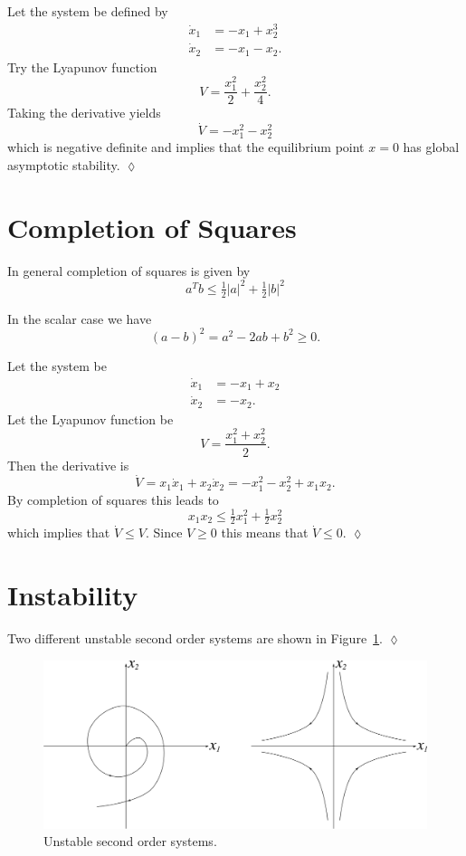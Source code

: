 \begin{example}
Let the system be defined by
\begin{align*}
\dot{x}_1 &= -x_1 + x_2^3 \\
\dot{x}_2 &= -x_1 - x_2.
\end{align*}
Try the Lyapunov function
$$V = \frac{x_1^2}{2} + \frac{x_2^2}{4}.$$
Taking the derivative yields
$$\dot{V} = -x_1^2 - x_2^2$$
which is negative definite and implies that the equilibrium point $x=0$ has global asymptotic stability.
$\lozenge$
\end{example}

\section{Completion of Squares}
In general completion of squares is given by
$$a^T b \leq \tfrac{1}{2}|a|^2 + \tfrac{1}{2}|b|^2$$

In the scalar case we have
$${(a-b)}^2 = a^2 - 2ab + b^2 \geq 0.$$

\begin{example}
Let the system be
\begin{align*}
\dot{x}_1 &= -x_1 + x_2 \\
\dot{x}_2 &= -x_2.
\end{align*}
Let the Lyapunov function be
$$V = \frac{x_1^2+x_2^2}{2}.$$
Then the derivative is
$$\dot{V} = x_1\dot{x}_1 + x_2\dot{x}_2 = -x_1^2 - x_2^2 + x_1x_2.$$
By completion of squares this leads to
$$x_1x_2 \leq \tfrac{1}{2}x_1^2 + \tfrac{1}{2}x_2^2$$
which implies that $\dot{V} \leq V$.
Since $V \geq 0$ this means that $\dot{V} \leq 0$.
$\lozenge$
\end{example}

\section{Instability}
\begin{example}
Two different unstable second order systems are shown in Figure~\ref{fig:10instability}.
$\lozenge$
\end{example}

\begin{figure}[ht!]
\centering
\includegraphics[width=.4\textwidth]{images/10instability}
\caption{Unstable second order systems.}
\label{fig:10instability}
\end{figure}

